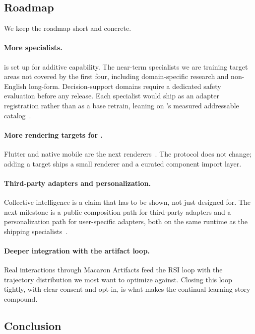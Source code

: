 \subsection{Roadmap}
\label{sec:disc_roadmap}

We keep the roadmap short and concrete.

\paragraph{More specialists.}
\molshort{} is set up for additive capability. The near-term specialists we are training target areas not covered by the first four, including domain-specific research and non-English long-form. Decision-support domains require a dedicated safety evaluation before any release. Each specialist would ship as an adapter registration rather than as a base retrain, leaning on \mint's measured addressable catalog~\citep{lu2026announcing}.

\paragraph{More rendering targets for \uifora.}
Flutter and native mobile are the next renderers~\citep{ui4a2026}. The protocol does not change; adding a target ships a small renderer and a curated component import layer.

\paragraph{Third-party adapters and personalization.}
Collective intelligence is a claim that has to be shown, not just designed for. The next milestone is a public composition path for third-party adapters and a personalization path for user-specific adapters, both on the same runtime as the shipping specialists~\citep{macaron_v1_blog2026}.

\paragraph{Deeper integration with the artifact loop.}
Real interactions through Macaron Artifacts feed the RSI loop with the trajectory distribution we most want to optimize against. Closing this loop tightly, with clear consent and opt-in, is what makes the continual-learning story compound.

\subsection{Conclusion}
\label{sec:disc_conclusion}


